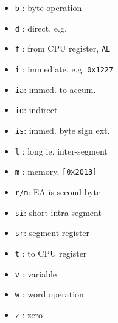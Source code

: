 \begin{itemize}
	\item\verb`b` : byte operation
	\item\verb`d` : direct, e.g.
	\item\verb`f` : from CPU register, \verb`AL`
	\item\verb`i` : immediate, e.g. \verb`0x1227`
	\item\verb`ia`: immed. to accum.
	\item\verb`id`: indirect
	\item\verb`is`: immed. byte sign ext.
	\item\verb`l` : long ie. inter-segment
	\item\verb`m` : memory, \verb`[0x2013]`
	\item\verb`r/m`: EA is second byte
	\item\verb`si`: short intra-segment
	\item\verb`sr`: segment register
	\item\verb`t` : to CPU register
	\item\verb`v` : variable
	\item\verb`w` : word operation
	\item\verb`z` : zero
\end{itemize}


